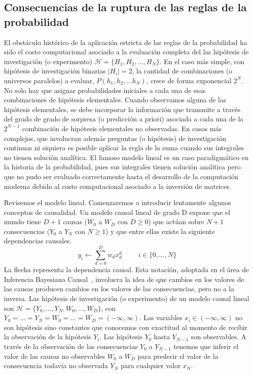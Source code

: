 \documentclass[a4paper,11pt]{book}
\theoremstyle{definition}
\begin{document}
\subsection{Consecuencias de la ruptura de las reglas de la probabilidad}

El obstáculo hist\'orico de la aplicaci\'on estricta de las reglas de la probabilidad ha sido el costo computacional asociado a la evaluaci\'on completa del las hip\'otesis de investigación (o experimento) $\mathcal{H} = \{H_1, H_2, \dots, H_N\}$.
%
En el caso más simple, con hip\'otesis de investigación binarias $|H_i|=2$, la cantidad de combinaciones (o universos paralelos) a evaluar, $P(h_1, h_2, \dots h_N)$, crece de forma exponencial $2^N$.
%
No solo hay que asignar probabilidades iniciales a cada una de esas combinaciones de hipótesis elementales.
%
Cuando observamos alguna de las hipótesis elementales, se debe incorporar la información que transmite a través del grado de grado de sorpresa (o predicción a priori) asociada a cada una de la $2^{N-1}$ combinación de hipótesis elementales no observadas.
%
En casos más complejos, que involucran además preguntas (o hipótesis) de investigación continuas ni siquiera es posible aplicar la regla de la suma cuando sus integrales no tienen solución anal\'itica.
%
El famoso modelo lineal es un caso paradigmático en la historia de la probabilidad, pues sus integrales tienen solución anal\'itica pero que no pudo ser evaluado correctamente hasta el desarrollo de la computación moderna debido al costo computacional asociado a la inversión de matrices.

%

Revisemos el modelo lineal.
%
Comenzaremos a introducir lentamente algunos conceptos de causalidad.
%
Un modelo causal lineal de grado D supone que el mundo tiene $D+1$ causas ($W_0$ a $W_D$ con $D\geq 0$) que actúan sobre $N+1$ consecuencias ($Y_0$ a $Y_{N}$ con $N\geq1$) y que entre ellas existe la siguiente dependencias causales.
%
\begin{equation*} \label{eq:modelo_lineal}
y_i \leftarrow \sum_{d = 0}^{D} w_d x_d^d \hspace{1cm} \text{$i \in \{0, \dots,N\}$}
\end{equation*}
%
La flecha representa la dependencia causal.
%
Esta notación, adoptada en el área de Inferencia Bayesiana Causal~\cite{pearl2009-causality}, involucra la idea de que cambios en los valores de las causas producen cambios en los valores de las consecuencias, pero no a la inversa.
%
Las hipótesis de investigación (o experimento) de un modelo causal lineal son $\mathcal{H}=\{Y_0, \dots , Y_N, W_0, \dots, W_D\}$, con $Y_0=\dots=Y_N=W_0=\dots = W_D = (-\infty, \infty)$.
%
Las variables $x_i \in (-\infty, \infty)$ no son hipótesis sino constantes que conocemos con exactitud al momento de recibir la observación de la hipótesis $Y_i$.
%
Las hipótesis $Y_0$ hasta $Y_{N-1}$ son observables.
%
A través de la observación de las consecuencias $Y_0$ a $Y_{N-1}$ tenemos que inferir el valor de las causas no observables $W_0$ a $W_D$ para predecir el valor de la consecuencia todav\'ia no observada $Y_{N}$ para cualquier valor $x_{N}$.
\end{document}
